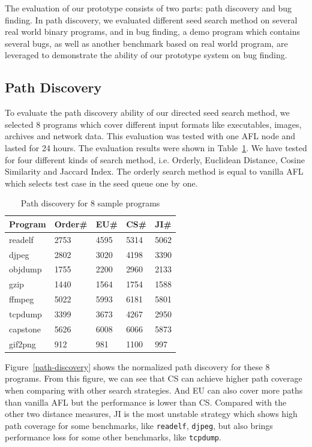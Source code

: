 The evaluation of our prototype consists of two parts: path discovery and bug finding. In path discovery, we evaluated different seed search method on several real world binary programs, and in bug finding, a demo program which contains several bugs, as well as another benchmark based on real world program, are leveraged to demonstrate the ability of our prototype system on bug finding.

\subsection{Path Discovery}
To evaluate the path discovery ability of our directed seed search method, we selected 8 programs which cover different input formats like executables, images, archives and network data. This evaluation was tested with one AFL node and lasted for 24 hours. The evaluation results were shown in Table~\ref{PD-8samples}. We have tested for four different kinds of search method, i.e. Orderly, Euclidean Distance, Cosine Similarity and Jaccard Index. The orderly search method is equal to vanilla AFL which selects test case in the seed queue one by one.  

\begin{table}
  \caption{\label{PD-8samples}Path discovery for 8 sample programs}
  \centering
	\begin{tabular}{p{2cm}<{\centering} p{1.5cm}<{\centering} p{1.5cm}<{\centering} p{1.5cm}<{\centering} p{1.5cm}<{\centering}}
		\toprule
		Program  & Order\# & EU\# & CS\# & JI\# \\ 
		\midrule
		readelf  &    2753 & 4595 & 5314 & 5062 \\
		 djpeg   &    2802 & 3020 & 4198 & 3390 \\
		objdump  &    1755 & 2200 & 2960 & 2133 \\
		  gzip   &    1440 & 1564 & 1754 & 1588 \\
		 ffmpeg  &    5022 & 5993 & 6181 & 5801 \\
		tcpdump  &    3399 & 3673 & 4267 & 2950 \\
		capstone &    5626 & 6008 & 6066 & 5873 \\
		gif2png  &     912 &  981 & 1100 &  997 \\ 
		\bottomrule
	\end{tabular}
\end{table}

Figure~\ref{path-discovery} shows the normalized path discovery for these 8 programs. From this figure, we can see that CS can achieve higher path coverage when comparing with other search strategies. And EU can also cover more paths than vanilla AFL but the performance is lower than CS. Compared with the other two distance measures, JI is the most unstable strategy which shows high path coverage for some benchmarks, like \texttt{readelf}, \texttt{djpeg}, but also brings performance loss for some other benchmarks, like \texttt{tcpdump}. 

